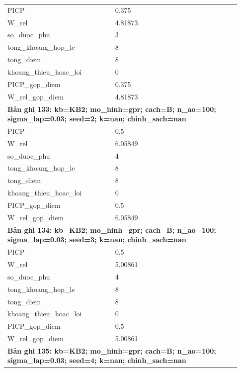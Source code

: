 \begin{longtable}{p{0.43\linewidth}p{0.50\linewidth}}
PICP & 0.375 \\
W\_\allowbreak rel & 4.81873 \\
so\_\allowbreak duoc\_\allowbreak phu & 3 \\
tong\_\allowbreak khoang\_\allowbreak hop\_\allowbreak le & 8 \\
tong\_\allowbreak diem & 8 \\
khoang\_\allowbreak thieu\_\allowbreak hoac\_\allowbreak loi & 0 \\
PICP\_\allowbreak gop\_\allowbreak diem & 0.375 \\
W\_\allowbreak rel\_\allowbreak gop\_\allowbreak diem & 4.81873 \\
\midrule
\multicolumn{2}{p{0.95\linewidth}}{\textbf{Bản ghi 133: kb=KB2; mo\_hinh=gpr; cach=B; n\_ao=100; sigma\_lap=0.03; seed=2; k=nan; chinh\_sach=nan}} \\
PICP & 0.5 \\
W\_\allowbreak rel & 6.05849 \\
so\_\allowbreak duoc\_\allowbreak phu & 4 \\
tong\_\allowbreak khoang\_\allowbreak hop\_\allowbreak le & 8 \\
tong\_\allowbreak diem & 8 \\
khoang\_\allowbreak thieu\_\allowbreak hoac\_\allowbreak loi & 0 \\
PICP\_\allowbreak gop\_\allowbreak diem & 0.5 \\
W\_\allowbreak rel\_\allowbreak gop\_\allowbreak diem & 6.05849 \\
\midrule
\multicolumn{2}{p{0.95\linewidth}}{\textbf{Bản ghi 134: kb=KB2; mo\_hinh=gpr; cach=B; n\_ao=100; sigma\_lap=0.03; seed=3; k=nan; chinh\_sach=nan}} \\
PICP & 0.5 \\
W\_\allowbreak rel & 5.00861 \\
so\_\allowbreak duoc\_\allowbreak phu & 4 \\
tong\_\allowbreak khoang\_\allowbreak hop\_\allowbreak le & 8 \\
tong\_\allowbreak diem & 8 \\
khoang\_\allowbreak thieu\_\allowbreak hoac\_\allowbreak loi & 0 \\
PICP\_\allowbreak gop\_\allowbreak diem & 0.5 \\
W\_\allowbreak rel\_\allowbreak gop\_\allowbreak diem & 5.00861 \\
\midrule
\multicolumn{2}{p{0.95\linewidth}}{\textbf{Bản ghi 135: kb=KB2; mo\_hinh=gpr; cach=B; n\_ao=100; sigma\_lap=0.03; seed=4; k=nan; chinh\_sach=nan}} \\

\end{longtable}
